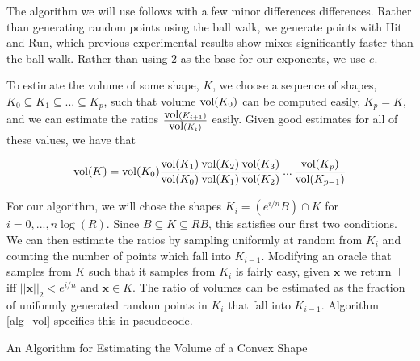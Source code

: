 The algorithm we will use follows %
with a few minor differences differences. Rather than generating random points using the ball walk, we generate points with Hit and Run, which previous experimental results show mixes significantly faster than the ball walk. Rather than using $2$ as the base for our exponents, we use $e$.

To estimate the volume of some shape, $K$, we choose a sequence of shapes, $K_0 \subseteq K_1 \subseteq ... \subseteq K_p$, such that volume $\mbox{vol} (K_0)$ can be computed easily, $K_p = K$, and we can estimate the ratios $\frac{\mbox{vol}(K_{i+1})}{\mbox{vol}(K_i)}$ easily. Given good estimates for all of these values, we have that

$$
\mbox{vol}(K) = \mbox{vol}(K_0) \frac{\mbox{vol}(K_1)}{\mbox{vol}(K_0)} \frac{\mbox{vol}(K_2)}{\mbox{vol}(K_1)} \frac{\mbox{vol}(K_3)}{\mbox{vol}(K_2)} \, ... \, \frac{\mbox{vol}(K_p)}{\mbox{vol}(K_{p-1})}
$$

For our algorithm, we will chose the shapes $K_i = (e^{i/n}B) \cap K$ for $i = 0, ..., n \log (R)$. Since $B \subseteq K \subseteq RB$, this satisfies our first two conditions. We can then estimate the ratios by sampling uniformly at random from $K_i$ and counting the number of points which fall into $K_{i-1}$. Modifying an oracle that samples from $K$ such that it samples from $K_i$ is fairly easy, given ${\bm x}$ we return $\top$ iff $||{\bm x}||_2 < e^{i/n}$ and ${\bm x} \in K$. The ratio of volumes can be estimated as the fraction of uniformly generated random points in $K_i$ that fall into $K_{i-1}$. Algorithm \ref{alg_vol} specifies this in pseudocode.

\begin{algorithm}
\SetAlgoLined
{}

\caption{An Algorithm for Estimating the Volume of a Convex Shape}\label{alg_vol}

\end{algorithm}

